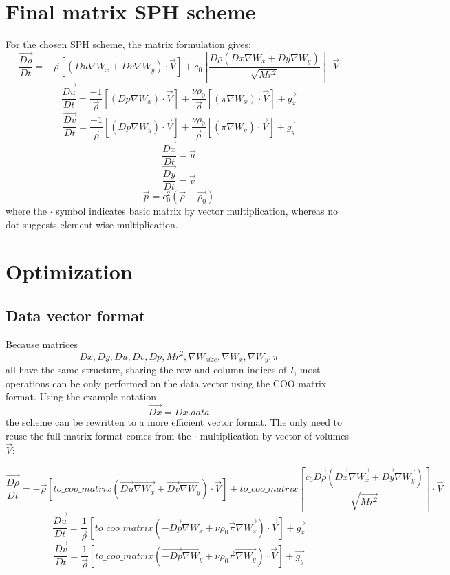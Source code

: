 \documentclass{article}
\begin{document}
\section{Final matrix SPH scheme}
For the chosen SPH scheme, the matrix formulation gives:
$$
\overrightarrow{\frac{D\rho}{Dt}}=-\Vec{\rho}\left[\left(Du\nabla W_x + Dv \nabla W_y\right)\cdot\Vec{V}\right]
+
c_0\left[\frac{D\rho\left(Dx\nabla W_x + Dy\nabla W_y \right)}{\sqrt{Mr^2}}\right]\cdot\Vec{V}
$$
$$
\overrightarrow{\frac{Du}{Dt}}=\frac{-1}{\Vec{\rho}}\left[\left(Dp\nabla W_x\right)\cdot\Vec{V}\right]+\frac{\nu\rho_0}{\Vec{\rho}}\left[\left(\pi\nabla W_x\right)\cdot\Vec{V}\right]+\Vec{g_x}
$$
$$
\overrightarrow{\frac{Dv}{Dt}}=\frac{-1}{\Vec{\rho}}\left[\left(Dp\nabla W_y\right)\cdot\Vec{V}\right]+\frac{\nu\rho_0}{\Vec{\rho}}\left[\left(\pi\nabla W_y\right)\cdot\Vec{V}\right]+\Vec{g_y}
$$
$$\overrightarrow{\frac{Dx}{Dt}}=\Vec{u}$$
$$\overrightarrow{\frac{Dy}{Dt}}=\Vec{v}$$
$$
\vec{p}=c_0^2\left(\Vec{\rho}-\Vec{\rho_0}\right)
$$
where the $\cdot$ symbol indicates basic matrix by vector multiplication, whereas no dot suggests element-wise multiplication. 
\section{Optimization}
\subsection{Data vector format}
Because matrices 
$$Dx, Dy, Du, Dv, Dp, Mr^2, \nabla W_{size}, \nabla W_x, \nabla W_y, \pi$$
all have the same structure, sharing the row and column indices of $I$, most operations can be only performed on the data vector using the COO matrix format. Using the example notation
$$\vec{Dx} = Dx.data$$
the scheme can be rewritten to a more efficient vector format. The only need to reuse the full matrix format comes from the $\cdot$ multiplication by vector of volumes $\Vec{V}$:

$$
\overrightarrow{\frac{D\rho}{Dt}}
=
-\Vec{\rho}\left[to\_coo\_matrix\left(\vec{Du}\vec{\nabla W_x} + \vec{Dv} \vec{\nabla W_y}\right)\cdot\Vec{V}\right]
+
to\_coo\_matrix\left[\frac{c_0 \Vec{D\rho}\left(\Vec{Dx}\Vec{\nabla W_x} + \Vec{Dy}\Vec{\nabla W_y} \right)}{\sqrt{\Vec{Mr^2}}}\right]\cdot\Vec{V}
$$
$$
\overrightarrow{\frac{Du}{Dt}}
=
\frac{1}{\Vec{\rho}}\left[to\_coo\_matrix\left(\vec{-Dp}\vec{\nabla W_x}+\nu\rho_0\vec{\pi}\vec{\nabla W_x}\right)\cdot\Vec{V}\right]+\Vec{g_x}
$$
$$
\overrightarrow{\frac{Dv}{Dt}}
=
\frac{1}{\Vec{\rho}}\left[to\_coo\_matrix\left(\vec{-Dp}\vec{\nabla W_y}+\nu\rho_0\vec{\pi}\vec{\nabla W_y}\right)\cdot\Vec{V}\right]+\Vec{g_y}
$$
\end{document}
